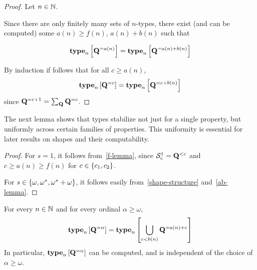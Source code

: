 \begin{proof}
    Let $n \in \mathbb{N}$.

    Since there are only finitely many sets of $n$-types,
    there exist (and can be computed)
    some $a(n) \ge f(n)$, $a(n) + b(n)$ such that

    \[
        \mathbf{type}_{n} \left[ {\mathbf{Q}^{= a(n)}} \right] = \mathbf{type}_{n} \left[ {\mathbf{Q}^{= a(n) + b(n)}} \right]
    \]

    By induction if follows that for all $c \ge a(n)$,
    \[\mathbf{type}_{n} \left[ {\mathbf{Q}^{= c}} \right] = \mathbf{type}_{n} \left[ {\mathbf{Q}^{= c + b(n)}} \right]\]
    since $\mathbf{Q}^{= c + 1} = \sum_{\mathbf{Q}} \mathbf{Q}^{= c}$.
\end{proof}

The next lemma shows that types stabilize not just for a single property, but uniformly across certain families of
properties. This uniformity is essential for later results on shapes and their computability.


\begin{proof}
    For $s = 1$, it follows from~\cref{f-lemma},
    since $^{1}_{c} = \qq^{< c}$
    and $c \ge a(n) \ge f(n)$ for $c \in {}$.

    For $s \in \left\{ {\omega, \omega^\ast, \omega^\ast + \omega} \right\}$, it follows easily from~\cref{shape-structure}
    and~\cref{ab-lemma}.
\end{proof}

\begin{lemma}
    For every $n \in \NN$ and for every ordinal $\alpha \ge \omega$,
    \[
        \mathbf{type}_{n} \left[ {\mathbf{Q}^{= \alpha}} \right] = \mathbf{type}_{n} \left[ {\bigcup_{c < b(n)}{\mathbf{Q}^{= a(n) + c}}} \right]
    \]
    In particular, $$ can be computed,
    and is independent of the choice of $\alpha \ge \omega$.
\end{lemma}

